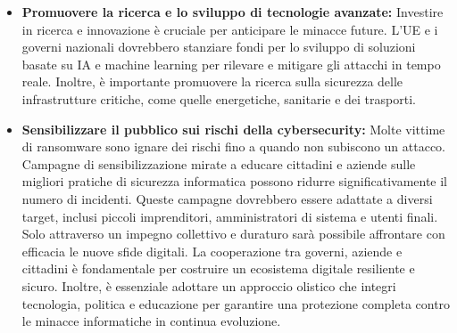 \documentclass[a4paper,12pt,twoside]{article}
\begin{document}
\begin{itemize}
    \item \textbf{Promuovere la ricerca e lo sviluppo di tecnologie avanzate:} Investire in ricerca e innovazione è cruciale per anticipare le minacce future. L'UE e i governi nazionali dovrebbero stanziare fondi per lo sviluppo di soluzioni basate su IA e machine learning per rilevare e mitigare gli attacchi in tempo reale. Inoltre, è importante promuovere la ricerca sulla sicurezza delle infrastrutture critiche, come quelle energetiche, sanitarie e dei trasporti.
    \item \textbf{Sensibilizzare il pubblico sui rischi della cybersecurity:} Molte vittime di ransomware sono ignare dei rischi fino a quando non subiscono un attacco. Campagne di sensibilizzazione mirate a educare cittadini e aziende sulle migliori pratiche di sicurezza informatica possono ridurre significativamente il numero di incidenti. Queste campagne dovrebbero essere adattate a diversi target, inclusi piccoli imprenditori, amministratori di sistema e utenti finali.
Solo attraverso un impegno collettivo e duraturo sarà possibile affrontare con efficacia le nuove sfide digitali. La cooperazione tra governi, aziende e cittadini è fondamentale per costruire un ecosistema digitale resiliente e sicuro. Inoltre, è essenziale adottare un approccio olistico che integri tecnologia, politica e educazione per garantire una protezione completa contro le minacce informatiche in continua evoluzione.
\end{itemize}




\newpage
\end{document}
